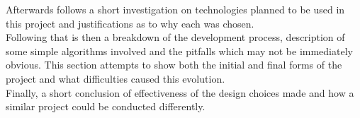     Afterwards follows a short investigation on technologies planned to be used in this project and justifications as to why each was chosen.\\

    Following that is then a breakdown of the development process, description of some simple algorithms involved and the pitfalls which may not be immediately obvious.
    This section attempts to show both the initial and final forms of the project and what difficulties caused this evolution.\\

    Finally, a short conclusion of effectiveness of the design choices made and how a similar project could be conducted differently.\\
